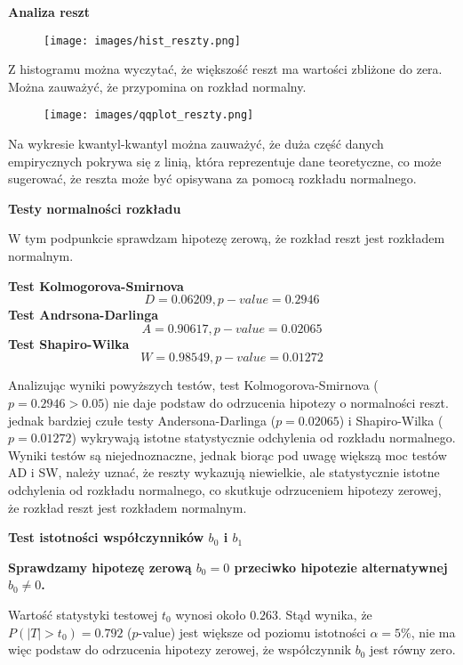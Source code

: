 \documentclass[12pt]{article}
\begin{document}
\vspace{0.5  cm}
{\bf \large Analiza reszt}

\begin{figure}[h]
    \centering
    \texttt{[image: images/hist\_reszty.png]}
\end{figure}
Z histogramu można wyczytać, że większość reszt ma wartości zbliżone do zera. Można zauważyć, że przypomina on rozkład normalny. 

\clearpage
\begin{figure}[h]
    \centering
    \texttt{[image: images/qqplot\_reszty.png]} 
\end{figure}

Na wykresie kwantyl-kwantyl można zauważyć, że duża część danych empirycznych pokrywa się z linią,  która reprezentuje dane teoretyczne, co może sugerować, że reszta może być opisywana za pomocą rozkładu normalnego.

{\bf \medium Testy normalności rozkładu}

W tym podpunkcie sprawdzam hipotezę zerową, że rozkład reszt jest rozkładem normalnym. 

{\bf \small Test Kolmogorova-Smirnova}
    \[D = 0.06209, p-value = 0.2946\]
{\bf \small Test Andrsona-Darlinga}
    \[A = 0.90617, p-value = 0.02065\]
{\bf \small Test Shapiro-Wilka}
    \[W = 0.98549, p-value = 0.01272\]

Analizując wyniki powyższych testów, test Kolmogorova-Smirnova ($p = 0.2946 > 0.05$) nie daje podstaw do odrzucenia hipotezy o normalności reszt. jednak bardziej czułe testy Andersona-Darlinga ($p = 0.02065$) i Shapiro-Wilka ($p = 0.01272$) wykrywają istotne statystycznie odchylenia od rozkładu normalnego. Wyniki testów są niejednoznaczne, jednak biorąc pod uwagę większą moc testów AD i SW, należy uznać, że reszty wykazują niewielkie, ale statystycznie istotne odchylenia od rozkładu normalnego, co skutkuje odrzuceniem hipotezy zerowej, że rozkład reszt jest rozkładem normalnym. 


{\bf \large Test istotności współczynników $b_0$ i $b_1$}

{\bf \small Sprawdzamy hipotezę zerową $b_0=0$ przeciwko hipotezie alternatywnej $b_0\neq0$.}

Wartość statystyki testowej $t_0$ wynosi około $0.263$. Stąd wynika, że $P(|T| > t_0) = 0.792$ ($p$-value) jest większe od poziomu istotności $\alpha = 5\%$, nie ma więc podstaw do odrzucenia hipotezy zerowej, że współczynnik $b_0$ jest równy zero.
\end{document}
